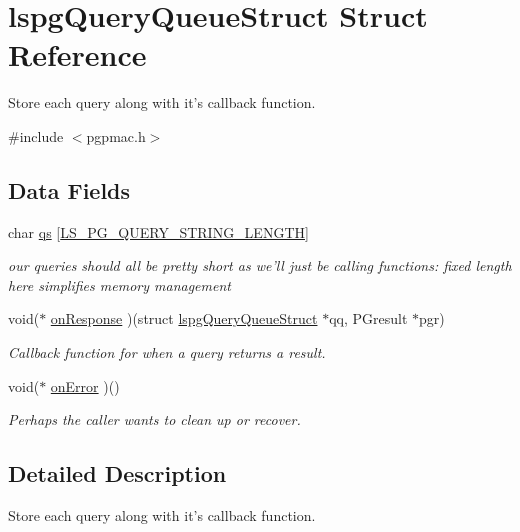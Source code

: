 \hypertarget{structlspgQueryQueueStruct}{\section{lspg\-Query\-Queue\-Struct Struct Reference}
\label{structlspgQueryQueueStruct}
}


Store each query along with it's callback function.  




{\ttfamily \#include $<$pgpmac.\-h$>$}

\subsection*{Data Fields}
\begin{DoxyCompactItemize}
\item 
char \hyperlink{structlspgQueryQueueStruct_a1389b3ec4ddf9ed5cc0344d229a7ff9e}{qs} \mbox{[}\hyperlink{pgpmac_8h_a3a8ef1b4b5994d6dd12bf74454ea891b}{L\-S\-\_\-\-P\-G\-\_\-\-Q\-U\-E\-R\-Y\-\_\-\-S\-T\-R\-I\-N\-G\-\_\-\-L\-E\-N\-G\-T\-H}\mbox{]}
\begin{DoxyCompactList}\small\item\em our queries should all be pretty short as we'll just be calling functions\-: fixed length here simplifies memory management \end{DoxyCompactList}\item 
void($\ast$ \hyperlink{structlspgQueryQueueStruct_a53bac5ae4cab775423940bff5092a831}{on\-Response} )(struct \hyperlink{structlspgQueryQueueStruct}{lspg\-Query\-Queue\-Struct} $\ast$qq, P\-Gresult $\ast$pgr)
\begin{DoxyCompactList}\small\item\em Callback function for when a query returns a result. \end{DoxyCompactList}\item 
void($\ast$ \hyperlink{structlspgQueryQueueStruct_ac7e4b4a8c59d7c814670ed1004154c2c}{on\-Error} )()
\begin{DoxyCompactList}\small\item\em Perhaps the caller wants to clean up or recover. \end{DoxyCompactList}\end{DoxyCompactItemize}


\subsection{Detailed Description}
Store each query along with it's callback function. 

